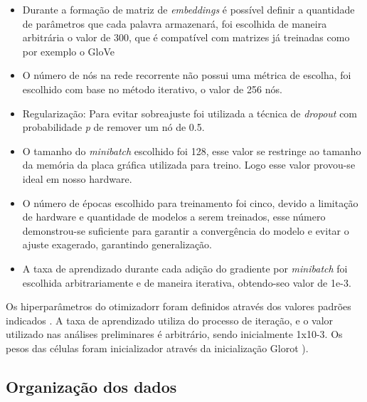 \documentclass[12pt]{article}
\begin{document}
\begin{itemize}
  \item Durante a formação de matriz de \textit{embeddings} é possível definir a quantidade de parâmetros que cada palavra armazenará, foi escolhida de maneira arbitrária o valor de 300, que é compatível com matrizes já treinadas como por exemplo o GloVe \cite{pennington2014glove}\\
  \item O número de nós na rede recorrente não possui uma métrica de escolha, foi escolhido com base no método iterativo, o valor de 256 nós.\\
  \item Regularização: Para evitar sobreajuste foi utilizada a técnica de \textit{dropout} com probabilidade \textit{p} de remover um nó de 0.5.\\
  \item O tamanho do \textit{minibatch} escolhido foi 128, esse valor se restringe ao tamanho da memória da placa gráfica utilizada para treino. Logo esse valor provou-se ideal em nosso hardware.\\
  \item O número de épocas escolhido para treinamento foi cinco, devido a limitação de hardware e quantidade de modelos a serem treinados, esse número demonstrou-se suficiente para garantir a convergência do modelo e evitar o ajuste exagerado, garantindo generalização.\\
  \item A taxa de aprendizado durante cada adição do gradiente por \textit{minibatch} foi escolhida arbitrariamente e de maneira iterativa, obtendo-seo valor de 1e-3.
\end{itemize}

Os hiperparâmetros do otimizadorr foram definidos através dos valores padrões indicados \cite{DBLP:journals/corr/KingmaB14}. A taxa de aprendizado utiliza do processo de iteração, e o valor utilizado nas análises preliminares é arbitrário, sendo inicialmente 1x10-3. Os pesos das células foram inicializador através da inicialização Glorot \cite{glorot:10}).

\subsection{Organização dos dados}
\end{document}
